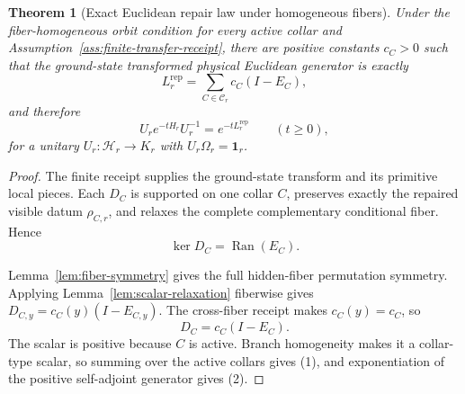 \documentclass[11pt]{article}
\numberwithin{equation}{section}
\newtheorem{theorem}{Theorem}[section]
\theoremstyle{remark}
\newcommand{\Rep}{\mathrm{rep}}
\newcommand{\Hcal}{\mathcal H}
\begin{document}
\begin{theorem}[Exact Euclidean repair law under homogeneous fibers]
\label{thm:ec-law}
Under the fiber-homogeneous orbit condition for every active collar and
Assumption~\ref{ass:finite-transfer-receipt}, there are positive constants
\(c_C>0\) such that the ground-state transformed physical Euclidean
generator is exactly
\[
L_r^{\Rep}=\sum_{C\in\mathcal C_r} c_C(I-E_C),
\tag{1}
\]
and therefore
\[
U_r e^{-tH_r}U_r^{-1}=e^{-tL_r^{\Rep}}
\qquad(t\ge0),
\tag{2}
\]
for a unitary \(U_r:\Hcal_r\to K_r\) with \(U_r\Omega_r=\mathbf 1_r\).
\end{theorem}

\begin{proof}
The finite receipt supplies the ground-state transform and its primitive local pieces. Each
\(D_C\) is supported on one collar \(C\), preserves exactly the repaired visible datum
\(\rho_{C,r}\), and relaxes the complete complementary conditional fiber. Hence
\[
\ker D_C=\operatorname{Ran}(E_C).
\]

Lemma~\ref{lem:fiber-symmetry} gives the full hidden-fiber permutation symmetry. Applying
Lemma~\ref{lem:scalar-relaxation} fiberwise gives
\(D_{C,y}=c_C(y)(I-E_{C,y})\). The cross-fiber receipt makes \(c_C(y)=c_C\), so
\[
D_C=c_C(I-E_C).
\]
The scalar is positive because \(C\) is active. Branch homogeneity makes it a collar-type scalar,
so summing over the active collars gives (1), and exponentiation of the positive self-adjoint
generator gives (2).
\end{proof}
\end{document}
